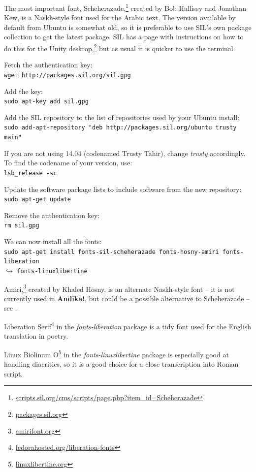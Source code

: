 The most important font, Scheherazade,\footnote{\url{scripts.sil.org/cms/scripts/page.php?item_id=Scheherazade}} created by Bob Hallissy and Jonathan Kew, is a Naskh-style font used for the Arabic text.  The version available by default from Ubuntu is somewhat old, so it is preferable to use SIL's own package collection to get the latest package.  SIL has a page with instructions on how to do this for the Unity desktop,\footnote{\url{packages.sil.org}} but as usual it is quicker to use the terminal.

Fetch the authentication key:\\
\verb|wget http://packages.sil.org/sil.gpg|

Add the key:\\
\verb|sudo apt-key add sil.gpg|

Add the SIL repository to the list of repositories used by your Ubuntu install:\\
\verb|sudo add-apt-repository "deb http://packages.sil.org/ubuntu trusty main"|

If you are not using 14.04 (codenamed Trusty Tahir), change \textit{trusty} accordingly.  To find the codename of your version, use:\\
\verb|lsb_release -sc|

Update the software package lists to include software from the new repository:\\
\verb|sudo apt-get update|

Remove the authentication key:\\
\verb|rm sil.gpg|

We can now install all the fonts:\\
\verb|sudo apt-get install fonts-sil-scheherazade fonts-hosny-amiri fonts-liberation|\\
$\hookrightarrow$ \verb|fonts-linuxlibertine|

Amiri,\footnote{\url{amirifont.org}} created by Khaled Hosny, is an alternate Naskh-style font -- it is not currently used in \textbf{Andika!}, but could be a possible alternative to Scheherazade -- see .

Liberation Serif\footnote{\url{fedorahosted.org/liberation-fonts}} in the \textit{fonts-liberation} package is a tidy font used for the English translation in poetry.

Linux Biolinum O\footnote{\url{linuxlibertine.org}} in the \textit{fonts-linuxlibertine} package is especially good at handling diacritics, so it is a good choice for a close transcription into Roman script.

